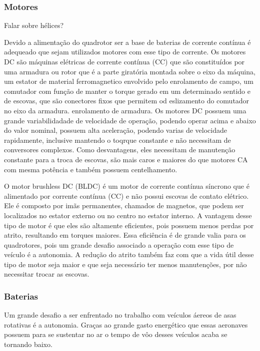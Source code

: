 \subsubsection{Motores}

Falar sobre hélices?

Devido a alimentação do quadrotor ser a base de baterias de corrente contínua é adequeado que sejam utilizados motores com esse tipo de corrente. Os motores DC são máquinas elétricas de corrente contínua (CC) que são constituídos por uma armadura ou rotor que é a parte giratória montada sobre o eixo da máquina, um estator de material ferromagnetico envolvido pelo enrolamento de campo, um comutador com função de manter o torque gerado em um determinado sentido e de escovas, que são conectores fixos que permitem od eslizamento do comutador no eixo da armadura. enrolamento de armadura. Os motores DC possuem uma grande variabilidadade de velocidade de operação, podendo operar acima e abaixo do valor nominal, possuem alta aceleração, podendo varias de velocidade rapidamente, inclusive mantendo o toqrque constante e não necessitam de conversores complexos. Como desvantagens, eles necessitam de manutenção constante para a troca de escovas, são mais caros e maiores do que motores CA com mesma potência e também possuem centelhamento.

O motor brushless DC (BLDC) é um motor de corrente contínua síncrono que é alimentado por corrente contínua (CC) e não possui escovas de contato elétrico. Ele é composto por imãs permanentes, chamados de magnetos, que podem ser localizados no estator externo ou no centro no estator interno. A vantagem desse tipo de motor é que eles são altamente eficientes, pois possuem menos perdas por atrito, resultando em torques maiores. Essa eficiência é de grande valia para os quadrotores, pois um grande desafio associado a operação com esse tipo de veículo é a autonomia. A redução do atrito também faz com que a vida útil desse tipo de motor seja maior e que seja necessário ter menos manutenções, por não necessitar trocar as escovas.

\subsubsection{Baterias}

Um grande desafio a ser enfrentado no trabalho com veículos áereos de asas rotativas é a autonomia. Graças ao grande gasto energético que essas aeronaves possuem para se sustentar no ar o tempo de vôo desses veículos acaba se tornando baixo.   

